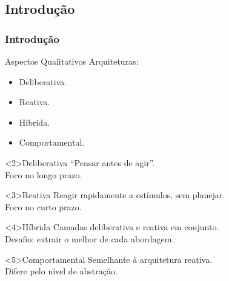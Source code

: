 \subsection{Introdução}
\begin{frame}
	\frametitle{Introdução}
	\begin{block}{Aspectos Qualitativos}
		Arquiteturas:
		\begin{itemize}
		  \item<1,2> Deliberativa.
		  \item<1,3> Reativa.
		  \item<1,4> Híbrida.
		  \item<1,5> Comportamental.
		\end{itemize}
	\end{block}
	
	\begin{overprint}
	\begin{exampleblock}{Deliberativa}
		``Pensar antes de agir''.\\
		Foco no longo prazo.
	\end{exampleblock}
	\begin{exampleblock}{Reativa}
		Reagir rapidamente a estímulos, sem planejar.\\
		Foco no curto prazo.
	\end{exampleblock}
	\begin{exampleblock}{Híbrida}
		Camadas deliberativa e reativa em conjunto.\\
		Desafio: extrair o melhor de cada abordagem.
	\end{exampleblock}
	\begin{exampleblock}{Comportamental}
		Semelhante à arquitetura reativa. \\
		Difere pelo nível de abstração.
	\end{exampleblock}
	\end{overprint}
\end{frame}